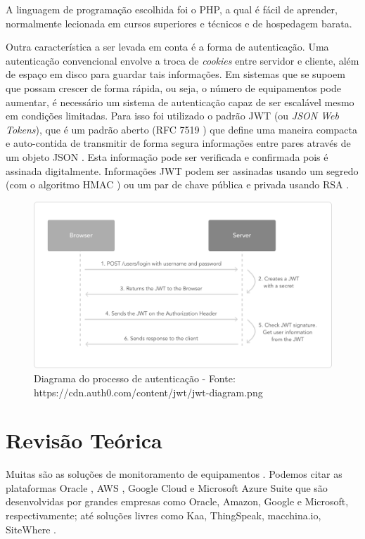 A linguagem de programação escolhida foi o PHP, a qual é fácil de
aprender, normalmente lecionada em cursos superiores e técnicos e de
hospedagem barata.

Outra característica a ser levada em conta é a forma de autenticação.
Uma autenticação convencional envolve a troca de \emph{cookies} entre
servidor e cliente, além de espaço em disco para guardar tais
informações. Em sistemas \iot que se supoem que possam crescer de forma
rápida, ou seja, o número de equipamentos pode aumentar, é necessário um
sistema de autenticação capaz de ser escalável mesmo em condições
limitadas. Para isso foi utilizado o padrão JWT (ou \emph{JSON Web
Tokens}), que é um padrão aberto (RFC 7519 \cite{rfc7519-2015}) que
define uma maneira compacta e auto-contida de transmitir de forma segura
informações entre pares através de um objeto JSON \cite{jwt-2016}. Esta
informação pode ser verificada e confirmada pois é assinada
digitalmente. Informações JWT podem ser assinadas usando um segredo (com
o algoritmo HMAC \cite{rfc2104-1997}) ou um par de chave pública e
privada usando RSA \cite{rfc3447-2003}.

\begin{figure}[h]
    \centering
    \includegraphics[scale=0.3]{img/jwt-diagram-grey.png}
    \caption{Diagrama do processo de autenticação - Fonte: https://cdn.auth0.com/content/jwt/jwt-diagram.png}
\end{figure}

\section{Revisão Teórica}\label{revisuxe3o-teuxf3rica}

Muitas são as soluções de monitoramento de equipamentos \iot. Podemos
citar as plataformas Oracle \iot, AWS \iot, Google Cloud \iot e
Microsoft Azure \iot Suite que são desenvolvidas por grandes empresas
como Oracle, Amazon, Google e Microsoft, respectivamente; até soluções
livres como Kaa, ThingSpeak, macchina.io, SiteWhere
\cite{postscapes-iot-2016}.

